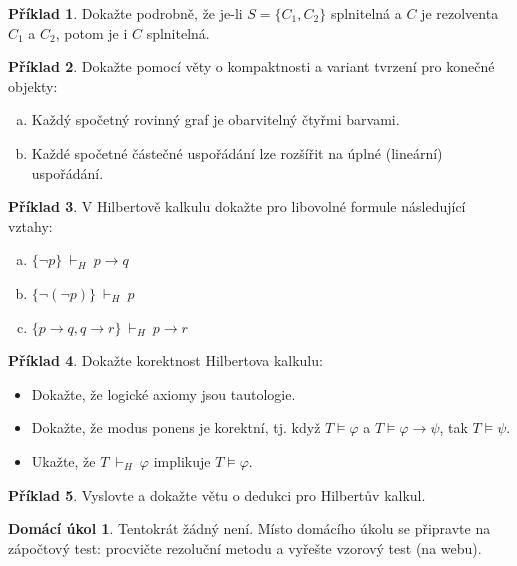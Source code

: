 \documentclass[a4paper]{article}
\theoremstyle{plain}
\theoremstyle{definition}
\newtheorem{problem}{Příklad}
\newtheorem*{ukol}{Domácí úkol}
\begin{document}
\medskip\begin{problem}
    Dokažte podrobně, že je-li $S=\{C_1,C_2\}$ splnitelná a $C$ je rezolventa $C_1$ a $C_2$, potom je i $C$ splnitelná.
\end{problem}

    
\medskip\begin{problem} Dokažte pomocí věty o kompaktnosti a variant tvrzení pro konečné objekty:
\begin{enumerate}[(a)]
    \item Každý spočetný rovinný graf je obarvitelný čtyřmi barvami.
    \item Každé spočetné částečné uspořádání lze rozšířit na úplné (lineární) uspořádání.
\end{enumerate}

\end{problem}



\medskip\begin{problem}
V Hilbertově kalkulu dokažte pro libovolné formule následující vztahy:
\begin{enumerate}[(a)]
    \item $\{\neg p\}\ \vdash_H\ p\to q$
    \item $\{\neg(\neg p)\}\ \vdash_H\ p$
    \item $\{p\to q,q \to r\}\ \vdash_H\ p\to r$
\end{enumerate}    
\end{problem}

\medskip\begin{problem}
    Dokažte korektnost Hilbertova kalkulu:
    \begin{itemize}
        \item Dokažte, že logické axiomy jsou tautologie.
        \item Dokažte, že modus ponens je korektní, tj. když $T\models\varphi$ a $T\models\varphi\to\psi$, tak $T\models\psi$.
        \item Ukažte, že $T\ \vdash_H\ \varphi$ implikuje $T\models\varphi$.
    \end{itemize}
    \end{problem}
    
\medskip\begin{problem}
    Vyslovte a dokažte větu o dedukci pro Hilbertův kalkul.
\end{problem}
    


\medskip\begin{ukol}
Tentokrát žádný není. Místo domácího úkolu se připravte na zápočtový test: procvičte rezoluční metodu a vyřešte vzorový test (na webu).
\end{ukol}
\end{document}
